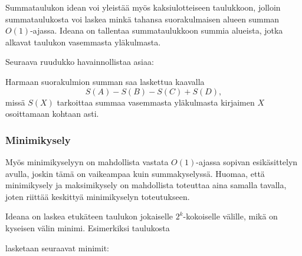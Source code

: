 Summataulukon idean voi yleistää
myös kaksiulotteiseen taulukkoon,
jolloin summataulukosta voi laskea
minkä tahansa suorakulmaisen alueen
summan $O(1)$-ajassa.
Ideana on tallentaa summataulukkoon summia
alueista, jotka alkavat taulukon vasemmasta yläkulmasta.

\begin{samepage}
Seuraava ruudukko havainnollistaa asiaa:
\begin{center}
\end{center}
\end{samepage}

Harmaan suorakulmion summan saa laskettua kaavalla
\[S(A) - S(B) - S(C) + S(D),\]
missä $S(X)$ tarkoittaa summaa vasemmasta
yläkulmasta kirjaimen $X$ osoittamaan kohtaan asti.

\subsubsection{Minimikysely}

Myös minimikyselyyn on mahdollista
vastata $O(1)$-ajassa sopivan esikäsittelyn avulla,
joskin tämä on vaikeampaa kuin summakyselyssä.
Huomaa, että minimikysely ja maksimikysely on
mahdollista toteuttaa aina samalla tavalla,
joten riittää keskittyä minimikyselyn toteutukseen. 

Ideana on laskea etukäteen taulukon jokaiselle
$2^k$-kokoiselle välille, mikä on kyseisen välin minimi.
Esimerkiksi taulukosta

\begin{center}
\end{center}
lasketaan seuraavat minimit:

